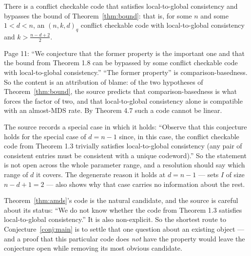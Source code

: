 \documentclass{conjura-conjecture}
\begin{document}
\begin{conjecture}[{\cite[\S 1.2]{AK23}}]\label{conj:main}
There is a conflict checkable code that satisfies local-to-global
consistency and bypasses the bound of Theorem~\ref{thm:bound}: that is,
for some $n$ and some $1 < d < n$, an $(n,k,d)_{q}$ conflict checkable
code with local-to-global consistency and $k > \frac{n-d+2}{2}$.
\end{conjecture}

\begin{remark}\label{rem:quote}
Page 11: ``We conjecture that the former property is the important one
and that the bound from Theorem 1.8 can be bypassed by some conflict
checkable code with local-to-global consistency.'' ``The former property''
is comparison-basedness. So the content is an attribution of blame: of
the two hypotheses of Theorem~\ref{thm:bound}, the source predicts that
comparison-basedness is what forces the factor of two, and that
local-to-global consistency alone is compatible with an almost-MDS rate.
By Theorem 4.7 such a code cannot be linear.
\end{remark}

\begin{remark}\label{rem:endpoint}
The source records a special case in which it holds: ``Observe that this
conjecture holds for the special case of $d = n-1$ since, in this case,
the conflict checkable code from Theorem 1.3 trivially satisfies
local-to-global consistency (any pair of consistent entries must be
consistent with a unique codeword).'' So the statement is not open across
the whole parameter range, and a resolution should say which range of $d$
it covers. The degenerate reason it holds at $d = n-1$ --- sets $I$ of size
$n-d+1 = 2$ --- also shows why that case carries no information about the
rest.
\end{remark}

\begin{remark}\label{rem:candidate}
Theorem~\ref{thm:amds}'s code is the natural candidate, and the source is
careful about its status: ``We do not know whether the code from
Theorem 1.3 satisfies local-to-global consistency.'' It is also
non-explicit. So the shortest route to Conjecture~\ref{conj:main} is to
settle that one question about an existing object --- and a proof that this
particular code does \emph{not} have the property would leave the
conjecture open while removing its most obvious candidate.
\end{remark}
\end{document}
